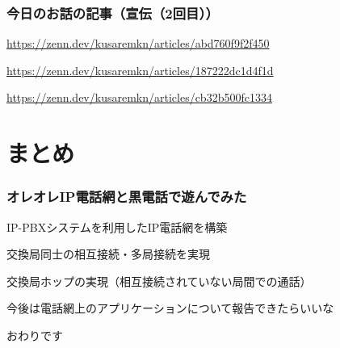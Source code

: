 \documentclass[
  lualatex,
  aspectratio=169,
  14pt
]{beamer}
\begin{document}
\begin{frame}
  \frametitle{今日のお話の記事（宣伝（2回目））}

  \begin{description}[labelwidth=\linewidth,itemsep=\zh]
    \item[いまさらVoIP網]
      {\small
      \url{https://zenn.dev/kusaremkn/articles/abd760f9f2f450}}
    \item[VoIPルータを使って黒電話をIP電話機にする]
      {\small
      \url{https://zenn.dev/kusaremkn/articles/187222dc1d4f1d}}
    \item[ICOM VE-TA10を使うためにパケットを書き換えたりする]
      {\small
      \url{https://zenn.dev/kusaremkn/articles/cb32b500fc1334}}
  \end{description}
\end{frame}

\section{まとめ}

\begin{frame}
  \frametitle{オレオレIP電話網と黒電話で遊んでみた}

  IP-PBXシステムを利用したIP電話網を構築

  交換局同士の相互接続・多局接続を実現

  交換局ホップの実現（相互接続されていない局間での通話）

  今後は電話網上のアプリケーションについて報告できたらいいな
\end{frame}

\begin{frame}[standout]
  おわりです
\end{frame}
\end{document}
